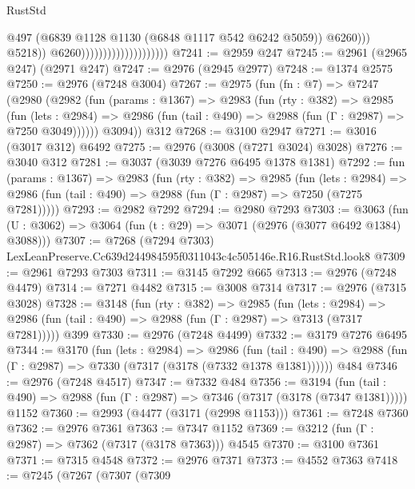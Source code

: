 \begin{lexlean}{RustStd}
\begin{coremodule}
                                                      @497
                                                      (@6839
                                                        @1128
                                                        @1130
                                                        (@6848 @1117 @542 @6242 @5059))
                                                      @6260)))
                                                @5218))
                                            @6260))))))))))))))))))))
@7241 := @2959 @247
@7245 := @2961 (@2965 @247) (@2971 @247)
@7247 := @2976 (@2945 @2977)
@7248 := @1374 @2575
@7250 := @2976 (@7248 @3004)
@7267 := @2975
    (fun (fn : @7) =>
    @7247
      (@2980
        (@2982
          (fun (params : @1367) =>
          @2983
            (fun (rty : @382) =>
            @2985
              (fun (lets : @2984) =>
              @2986 (fun (tail : @490) => @2988 (fun (Γ : @2987) => @7250 @3049))))))
        @3094))
    @312
@7268 := @3100 @2947
@7271 := @3016 (@3017 @312) @6492
@7275 := @2976 (@3008 (@7271 @3024) @3028)
@7276 := @3040 @312
@7281 := @3037 (@3039 @7276 @6495 @1378 @1381)
@7292 := fun (params : @1367) =>
  @2983
    (fun (rty : @382) =>
    @2985
      (fun (lets : @2984) =>
      @2986 (fun (tail : @490) => @2988 (fun (Γ : @2987) => @7250 (@7275 @7281)))))
@7293 := @2982 @7292
@7294 := @2980 @7293
@7303 := @3063 (fun (U : @3062) => @3064 (fun (t : @29) => @3071 (@2976 (@3077 @6492 @1384) @3088)))
@7307 := @7268 (@7294 @7303) LexLeanPreserve.Cc639d244984595f0311043c4c505146e.R16.RustStd.look8
@7309 := @2961 @7293 @7303
@7311 := @3145 @7292 @665
@7313 := @2976 (@7248 @4479)
@7314 := @7271 @4482
@7315 := @3008 @7314
@7317 := @2976 (@7315 @3028)
@7328 := @3148
    (fun (rty : @382) =>
    @2985
      (fun (lets : @2984) =>
      @2986 (fun (tail : @490) => @2988 (fun (Γ : @2987) => @7313 (@7317 @7281)))))
    @399
@7330 := @2976 (@7248 @4499)
@7332 := @3179 @7276 @6495
@7344 := @3170
    (fun (lets : @2984) =>
    @2986
      (fun (tail : @490) => @2988 (fun (Γ : @2987) => @7330 (@7317 (@3178 (@7332 @1378 @1381))))))
    @484
@7346 := @2976 (@7248 @4517)
@7347 := @7332 @484
@7356 := @3194
    (fun (tail : @490) => @2988 (fun (Γ : @2987) => @7346 (@7317 (@3178 (@7347 @1381)))))
    @1152
@7360 := @2993 (@4477 (@3171 (@2998 @1153)))
@7361 := @7248 @7360
@7362 := @2976 @7361
@7363 := @7347 @1152
@7369 := @3212 (fun (Γ : @2987) => @7362 (@7317 (@3178 @7363))) @4545
@7370 := @3100 @7361
@7371 := @7315 @4548
@7372 := @2976 @7371
@7373 := @4552 @7363
@7418 := @7245
    (@7267
      (@7307
        (@7309

\end{coremodule}
\end{lexlean}
